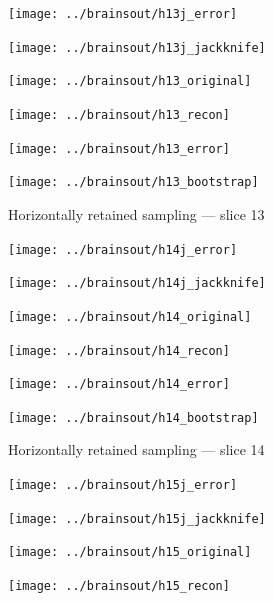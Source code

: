 \documentclass[article]{jdssv}
\begin{document}
\begin{appendix}
\begin{figure}
\begin{centering}
\parbox{\imsize}{\texttt{[image: ../brainsout/h13j\_error]}}
\parbox{\imsize}{\texttt{[image: ../brainsout/h13j\_jackknife]}}

\vspace{\vertsep}

\parbox{\imsize}{\texttt{[image: ../brainsout/h13\_original]}}
\parbox{\imsize}{\texttt{[image: ../brainsout/h13\_recon]}}

\vspace{\vertsep}

\parbox{\imsize}{\texttt{[image: ../brainsout/h13\_error]}}
\parbox{\imsize}{\texttt{[image: ../brainsout/h13\_bootstrap]}}

\end{centering}
\caption{Horizontally retained sampling --- slice 13}
\end{figure}


\begin{figure}
\begin{centering}

\parbox{\imsize}{\texttt{[image: ../brainsout/h14j\_error]}}
\parbox{\imsize}{\texttt{[image: ../brainsout/h14j\_jackknife]}}

\vspace{\vertsep}

\parbox{\imsize}{\texttt{[image: ../brainsout/h14\_original]}}
\parbox{\imsize}{\texttt{[image: ../brainsout/h14\_recon]}}

\vspace{\vertsep}

\parbox{\imsize}{\texttt{[image: ../brainsout/h14\_error]}}
\parbox{\imsize}{\texttt{[image: ../brainsout/h14\_bootstrap]}}

\end{centering}
\caption{Horizontally retained sampling --- slice 14}
\end{figure}


\begin{figure}
\begin{centering}

\parbox{\imsize}{\texttt{[image: ../brainsout/h15j\_error]}}
\parbox{\imsize}{\texttt{[image: ../brainsout/h15j\_jackknife]}}

\vspace{\vertsep}

\parbox{\imsize}{\texttt{[image: ../brainsout/h15\_original]}}
\parbox{\imsize}{\texttt{[image: ../brainsout/h15\_recon]}}

\vspace{\vertsep}


\end{centering}
\end{figure}
\end{appendix}
\end{document}
